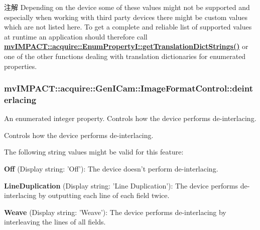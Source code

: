 \begin{DoxyNote}{注解}
Depending on the device some of these values might not be supported and especially when working with third party devices there might be custom values which are not listed here. To get a complete and reliable list of supported values at runtime an application should therefore call {\bfseries \hyperlink{classmv_i_m_p_a_c_t_1_1acquire_1_1_enum_property_i_a0ba6ccbf5ee69784d5d0b537924d26b6}{mv\+I\+M\+P\+A\+C\+T\+::acquire\+::\+Enum\+Property\+I\+::get\+Translation\+Dict\+Strings()}} or one of the other functions dealing with translation dictionaries for enumerated properties. 
\end{DoxyNote}
\hypertarget{classmv_i_m_p_a_c_t_1_1acquire_1_1_gen_i_cam_1_1_image_format_control_a4a1e64f8caa06a00302a3a77d9206e16}{
\subsubsection[{deinterlacing}]{ mv\+I\+M\+P\+A\+C\+T\+::acquire\+::\+Gen\+I\+Cam\+::\+Image\+Format\+Control\+::deinterlacing}}\label{classmv_i_m_p_a_c_t_1_1acquire_1_1_gen_i_cam_1_1_image_format_control_a4a1e64f8caa06a00302a3a77d9206e16}


An enumerated integer property. Controls how the device performs de-\/interlacing. 

Controls how the device performs de-\/interlacing.

The following string values might be valid for this feature\+:
\begin{DoxyItemize}
\item {\bfseries Off} (Display string\+: 'Off')\+: The device doesn't perform de-\/interlacing.
\item {\bfseries Line\+Duplication} (Display string\+: 'Line Duplication')\+: The device performs de-\/interlacing by outputting each line of each field twice.
\item {\bfseries Weave} (Display string\+: 'Weave')\+: The device performs de-\/interlacing by interleaving the lines of all fields.
\end{DoxyItemize}


